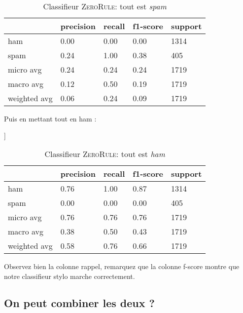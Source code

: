 
\begin{table}[h]
\begin{center}
\begin{tabular}{lllll}
\hline
 &   precision& recall & f1-score &  support\\
\hline
	 ham&   0.00&  0.00&  0.00&  1314\\
	spam&   0.24&  1.00&  0.38&   405\\
\hline
   micro avg&   0.24&  0.24&  0.24&  1719\\
   macro avg&   0.12&  0.50&  0.19&  1719\\
weighted avg&   0.06&  0.24&  0.09&  1719\\
\hline
\end{tabular}
\caption{Classifieur \textsc{ZeroRule}: tout est \textit{spam}}
\end{center}
\end{table}

Puis en mettant tout en ham :

\begin{python}
[[1314    0]
 [ 405    0]]
\end{python}

\begin{table}[h]
\begin{center}
\begin{tabular}{lllll}
\hline
 &   precision& recall & f1-score &  support\\
\hline
 ham&   0.76&  1.00&  0.87&  1314\\
spam&   0.00&  0.00&  0.00&   405\\
\hline
   micro avg&   0.76&  0.76&  0.76&  1719\\
   macro avg&   0.38&  0.50&  0.43&  1719\\
weighted avg&   0.58&  0.76&  0.66&  1719\\


\hline
\end{tabular}
\caption{Classifieur \textsc{ZeroRule}: tout est \textit{ham}}
\end{center}
\end{table}

Observez bien la colonne rappel, remarquez que la colonne f-score montre que notre classifieur stylo marche correctement.

\subsection*{On peut combiner les deux ?}

